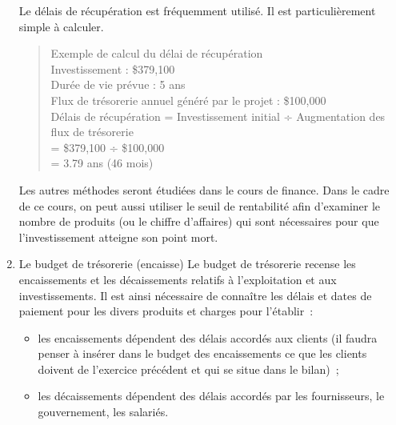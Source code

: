 \documentclass{tufte-handout}
\begin{document}
\begin{enumerate}
Le délais de récupération est fréquemment utilisé. Il est particulièrement simple à calculer.\\

\begin{verse}
Exemple de calcul du délai de récupération\\
Investissement : \$379,100\\
Durée de vie prévue : 5  ans\\
Flux de trésorerie annuel généré par le projet : \$100,000\\
Délais de récupération = Investissement initial  ÷  Augmentation des flux de trésorerie\\
= \$379,100 ÷ \$100,000\\
= 3.79 ans (46 mois)\\
\end{verse}

Les autres méthodes seront étudiées dans le cours de finance. Dans le cadre de ce cours, on peut aussi utiliser le seuil de rentabilité afin d'examiner le nombre de produits (ou le chiffre d'affaires) qui sont nécessaires pour que l'investissement atteigne son point mort.\\
\item Le budget de trésorerie (encaisse)
\label{sec:org0ed390d}
Le budget de trésorerie recense les encaissements et les décaissements relatifs à l'exploitation et aux investissements. Il est ainsi nécessaire de connaître les délais et dates de paiement pour les divers produits et charges pour l'établir :\\
\begin{itemize}
\item les encaissements dépendent des délais accordés aux clients (il faudra penser à insérer dans le budget des encaissements ce que les clients doivent de l'exercice précédent et qui se situe dans le bilan) ;\\
\item les décaissements dépendent des délais accordés par les fournisseurs, le gouvernement, les salariés.\\
\end{itemize}


\end{enumerate}
\end{document}
